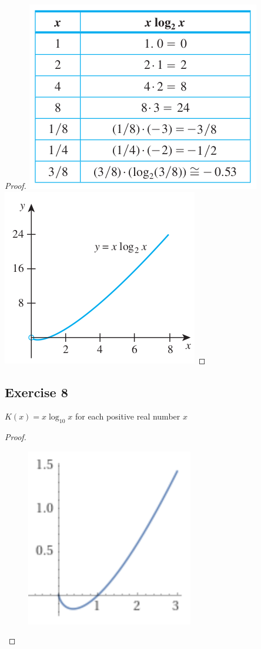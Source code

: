 \documentclass[14pt]{extarticle}
\begin{document}
\begin{proof}
\includegraphics[scale=0.5]{../images/11.4.7.1.png}
\includegraphics[scale=0.5]{../images/11.4.7.2.png}
\end{proof}

\subsection{Exercise 8}
\(K(x) = x \log_{10} x\) for each positive real number \(x\)

\begin{proof}
\begin{figure}[ht!]
\centering
\includegraphics[scale=0.5]{../images/11.4.8.png}
\end{figure}
\end{proof}
\end{document}
